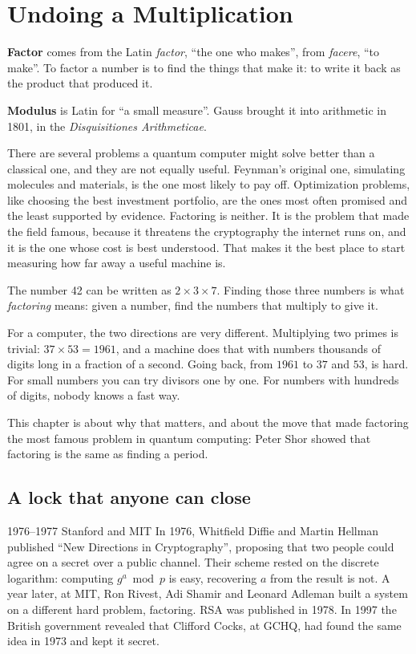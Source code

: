 \chapter{Undoing a Multiplication}\label{ch:factoring}

\begin{etymology}
\textbf{Factor} comes from the Latin \emph{factor}, ``the one who makes'', from
\emph{facere}, ``to make''. To factor a number is to find the things that make
it: to write it back as the product that produced it.

\textbf{Modulus} is Latin for ``a small measure''. Gauss brought it into
arithmetic in 1801, in the \emph{Disquisitiones Arithmeticae}.
\end{etymology}

There are several problems a quantum computer might solve better than a classical
one, and they are not equally useful. Feynman's original one, simulating molecules
and materials, is the one most likely to pay off. Optimization problems, like
choosing the best investment portfolio, are the ones most often promised and the
least supported by evidence. Factoring is neither. It is the problem that made the
field famous, because it threatens the cryptography the internet runs on, and it is
the one whose cost is best understood. That makes it the best place to start
measuring how far away a useful machine is.

The number 42 can be written as $2 \times 3 \times 7$. Finding those three
numbers is what \emph{factoring} means: given a number, find the numbers that
multiply to give it.

For a computer, the two directions are very different. Multiplying two primes
is trivial: $37 \times 53 = 1961$, and a machine does that with numbers
thousands of digits long in a fraction of a second. Going back, from $1961$ to
$37$ and $53$, is hard. For small numbers you can try divisors one by one. For
numbers with hundreds of digits, nobody knows a fast way.

This chapter is about why that matters, and about the move that made factoring
the most famous problem in quantum computing: Peter Shor showed that factoring
is the same as finding a period.

\section{A lock that anyone can close}

\begin{history}{1976--1977 \textperiodcentered{} Stanford and MIT}
In 1976, Whitfield Diffie and Martin Hellman published ``New Directions in
Cryptography'', proposing that two people could agree on a secret over a public
channel. Their scheme rested on the discrete logarithm: computing $g^a \bmod p$
is easy, recovering $a$ from the result is not. A year later, at MIT, Ron
Rivest, Adi Shamir and Leonard Adleman built a system on a different hard
problem, factoring. RSA was published in 1978. In 1997 the British government
revealed that Clifford Cocks, at GCHQ, had found the same idea in 1973 and kept
it secret.
\end{history}

